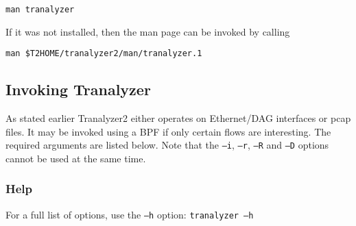 \begin{center}
    {\tt man tranalyzer}\\
\end{center}

If it was not installed, then the man page can be invoked by calling

\begin{center}
{\tt man \$T2HOME/tranalyzer2/man/tranalyzer.1}
\end{center}

\subsection{Invoking Tranalyzer}
As stated earlier Tranalyzer2 either operates on Ethernet/DAG interfaces or pcap files. It may be invoked using a BPF if only certain flows are interesting. The required arguments are listed below. Note that the {\tt --i}, {\tt --r}, {\tt --R} and {\tt --D} options cannot be used at the same time.


\subsubsection{Help}
For a full list of options, use the {\tt --h} option: {\tt tranalyzer --h}


